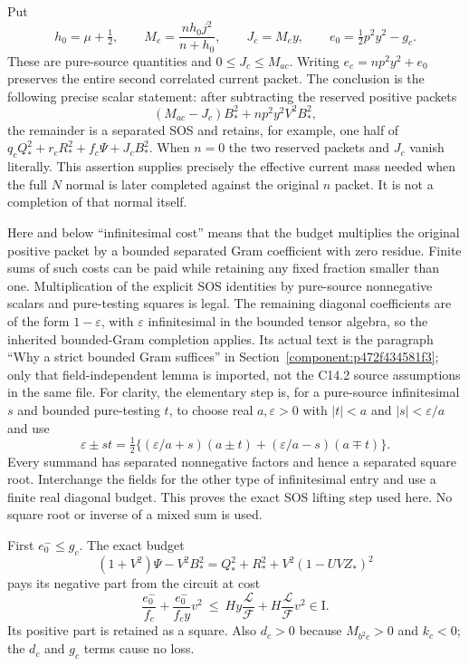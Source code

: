 Put
\[
 h_0=\mu+\tfrac12,\qquad
 M_e=\frac{nh_0j^2}{n+h_0},\qquad J_c=M_ey,
 \qquad e_0=\tfrac12p^2y^2-g_c.
 \tag{RSR21}
\]
These are pure-source quantities and $0\leq J_c\leq M_{ac}$.
Writing $e_c=np^2y^2+e_0$ preserves the entire second correlated
current packet. The conclusion is the following precise scalar
statement: after subtracting the reserved positive packets
\[
 (M_{ac}-J_c)B_*^2+np^2y^2V^2B_*^2,
 \tag{RSR22}
\]
the remainder is a separated SOS and retains, for example, one half
of $q_cQ_*^2+r_cR_*^2+f_c\Psi+J_cB_*^2$.
When $n=0$ the two reserved packets and $J_c$ vanish literally.
This assertion supplies precisely the effective current mass needed
when the full $N$ normal is later completed against the original $n$
packet. It is not a completion of that normal itself.

Here and below ``infinitesimal cost'' means that the budget multiplies
the original positive packet by a bounded separated Gram coefficient
with zero residue. Finite sums of such costs can be paid while retaining
any fixed fraction smaller than one. Multiplication of the explicit
SOS identities by pure-source nonnegative scalars and pure-testing
squares is legal. The remaining diagonal coefficients are of the form
$1-\varepsilon$, with $\varepsilon$ infinitesimal in the bounded tensor
algebra, so the inherited bounded-Gram completion applies. Its actual
text is the paragraph ``Why a strict bounded Gram suffices'' in
Section~\ref{component:p472f434581f3}; only that field-independent
lemma is imported, not the C14.2 source assumptions in the same file.
For clarity, the elementary step is, for a pure-source infinitesimal
$s$ and bounded pure-testing $t$, to choose real $a,\varepsilon>0$
with $|t|<a$ and $|s|<\varepsilon/a$ and use
\[
 \varepsilon\pm st=\tfrac12\{(\varepsilon/a+s)(a\pm t)
                         +(\varepsilon/a-s)(a\mp t)\}.
\]
Every summand has separated nonnegative factors and hence a separated
square root. Interchange the fields for the other type of infinitesimal
entry and use a finite real diagonal budget. This proves the exact
SOS lifting step used here. No square root or inverse of a mixed sum
is used.

First $e_0^-\leq g_c$. The exact budget
\[
 (1+V^2)\Psi-V^2B_*^2
 =Q_*^2+R_*^2+V^2(1-UVZ_*)^2
 \tag{RSR23}
\]
pays its negative part from the circuit at cost
\[
 \frac{e_0^-}{f_c}+\frac{e_0^-}{f_cy}v^2
 \ \leq\ Hy\frac{\mathcal L}{\mathcal F}
       +H\frac{\mathcal L}{\mathcal F}v^2\in\mathrm I.
\]
Its positive part is retained as a square. Also $d_c>0$ because
$M_{b^2c}>0$ and $k_c<0$; the $d_c$ and $g_c$ terms cause no loss.

